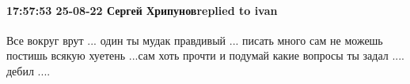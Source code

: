  
 
 
 
 

\paragraph{17:57:53 25-08-22 Сергей Хрипуновreplied to ivan}

Все вокруг врут ... один ты мудак правдивый ... писать много сам не можешь
постишь всякую хуетень ...сам хоть прочти и подумай какие вопросы ты задал ....
дебил ....
